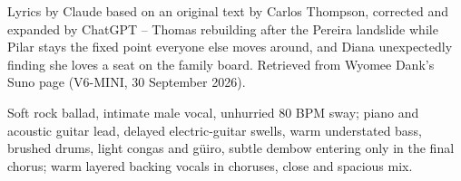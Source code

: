
\begin{notes}
Lyrics by Claude based on an original text by Carlos Thompson, corrected and expanded by ChatGPT -- Thomas rebuilding after the Pereira landslide while Pilar stays the fixed point everyone else moves around, and Diana unexpectedly finding she loves a seat on the family board. Retrieved from Wyomee Dank's Suno page (V6-MINI, 30 September 2026).
\end{notes}
\begin{style}
Soft rock ballad, intimate male vocal, unhurried 80 BPM sway; piano and acoustic guitar lead, delayed electric-guitar swells, warm understated bass, brushed drums, light congas and güiro, subtle dembow entering only in the final chorus; warm layered backing vocals in choruses, close and spacious mix.
\end{style}
